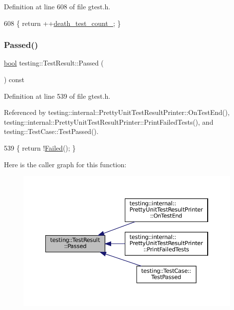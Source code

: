 Definition at line 608 of file gtest.\+h.


\begin{DoxyCode}
608 \{ \textcolor{keywordflow}{return} ++\hyperlink{classtesting_1_1TestResult_a3810b34e68f5dca9ad1237a5bde7fa21}{death\_test\_count\_}; \}
\end{DoxyCode}
\mbox{\label{classtesting_1_1TestResult_acf7e6e72f05a0545c48ea48e7f8851df}} 
\subsubsection{\texorpdfstring{Passed()}{Passed()}}
{\footnotesize\ttfamily \hyperlink{classbool}{bool} testing\+::\+Test\+Result\+::\+Passed (\begin{DoxyParamCaption}{ }\end{DoxyParamCaption}) const\hspace{0.3cm}{\ttfamily [inline]}}



Definition at line 539 of file gtest.\+h.



Referenced by testing\+::internal\+::\+Pretty\+Unit\+Test\+Result\+Printer\+::\+On\+Test\+End(), testing\+::internal\+::\+Pretty\+Unit\+Test\+Result\+Printer\+::\+Print\+Failed\+Tests(), and testing\+::\+Test\+Case\+::\+Test\+Passed().


\begin{DoxyCode}
539 \{ \textcolor{keywordflow}{return} !\hyperlink{classtesting_1_1TestResult_afacc37e8b43c8574e4101bc61723c769}{Failed}(); \}
\end{DoxyCode}
Here is the caller graph for this function\+:
\nopagebreak
\begin{figure}[H]
\begin{center}
\leavevmode
\includegraphics[width=350pt]{classtesting_1_1TestResult_acf7e6e72f05a0545c48ea48e7f8851df_icgraph}
\end{center}
\end{figure}
\mbox{\label{classtesting_1_1TestResult_ac253b0fd7ea70f457e9517e415eac32d}} 
